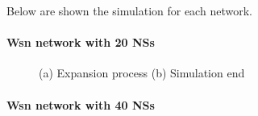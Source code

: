 Below are shown the simulation for each network. 

\paragraph{Wsn network with 20 NSs}

\begin{figure}[H]
    \centering
    \caption{(a) Expansion process (b) Simulation end}
    \label{fig:foobar}
\end{figure}

\paragraph{Wsn network with 40 NSs}

